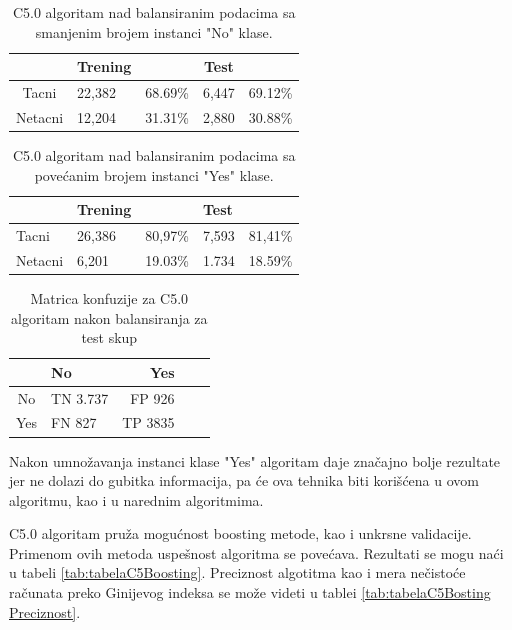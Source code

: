 \documentclass[a4paper]{article}
\begin{document}
\begin{table}[h!]
\begin{center}
\caption{C5.0 algoritam nad balansiranim podacima sa smanjenim brojem instanci "No" klase.}
\begin{tabular}{|c|l|r|c|c|} \hline
& Trening& & Test & \\ \hline
Tacni &22,382&68.69\%&6,447&69.12\%\\ \hline
Netacni&12,204 &31.31\%&2,880&30.88\%\\ \hline
\end{tabular}
\label{tab:tabelaC5Balans1}
\end{center}
\end{table}

\begin{table}[h!]
\begin{center}
\caption{C5.0 algoritam nad balansiranim podacima sa povećanim brojem instanci "Yes" klase.}
\begin{tabular}{|l|l|l|l|l|} \hline
& Trening& & Test & \\ \hline
Tacni &26,386&80,97\%&7,593&81,41\%\\ \hline
Netacni&6,201 &19.03\%&1.734&18.59\%\\ \hline
\end{tabular}
\label{tab:tabelaC5Balans2}
\end{center}
\end{table}

\begin{table}[h!]
\begin{center}
\caption{Matrica konfuzije za C5.0 algoritam nakon balansiranja za test skup}
\begin{tabular}{|c|l|r|c|c|} \hline
& No& Yes \\ \hline
No &TN 3.737 &FP 926 \\ \hline
Yes &FN 827 &TP 3835 \\ \hline
\end{tabular}
\label{tab:tabelaC5matricaKonfuzijeBalans}
\end{center}
\end{table}

Nakon umnožavanja instanci klase "Yes" algoritam daje značajno bolje rezultate jer ne dolazi do gubitka informacija, pa će ova tehnika biti korišćena u ovom algoritmu, kao i u narednim algoritmima.

C5.0 algoritam pruža mogućnost boosting metode, kao i unkrsne validacije. Primenom ovih metoda uspešnost algoritma se povećava. Rezultati se mogu naći u tabeli \ref{tab:tabelaC5Boosting}. Preciznost algotitma kao i mera nečistoće računata preko Ginijevog indeksa se može videti u tablei \ref{tab:tabelaC5Bosting Preciznost}.
\end{document}
